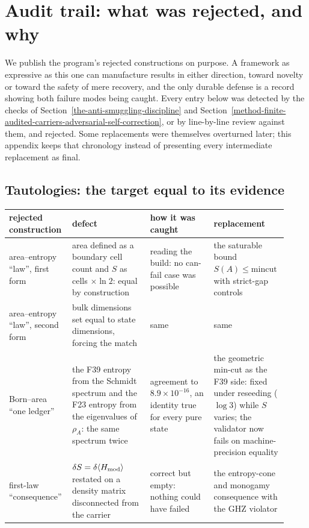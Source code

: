 \section{Audit trail: what was rejected, and why}\label{adversarial-audit-trail-what-was-rejected-and-why}

We publish the program's rejected constructions on purpose. A framework as expressive as this one can manufacture
results in either direction, toward novelty or toward the safety of mere recovery, and the only durable defense is a
record showing both failure modes being caught. Every entry below was detected by the checks of
Section~\ref{the-anti-smuggling-discipline} and Section~\ref{method-finite-audited-carriers-adversarial-self-correction},
or by line-by-line review against them, and rejected. Some replacements were themselves overturned later; this appendix
keeps that chronology instead of presenting every intermediate replacement as final.

\subsection{Tautologies: the target equal to its evidence}\label{tautologies-the-target-equal-to-its-evidence}

\begin{center}
\small
\begin{longtable}[]{@{}p{0.2\linewidth}p{0.27\linewidth}p{0.22\linewidth}p{0.23\linewidth}@{}}
\toprule
rejected construction & defect & how it was caught & replacement\\
\midrule
\endhead
area--entropy ``law'', first form & area defined as a boundary cell count and \(S\) as cells \(\times\ln2\): equal by
construction & reading the build: no can-fail case was possible & the saturable bound \(S(A)\le\mathrm{mincut}\) with
strict-gap controls\\
area--entropy ``law'', second form & bulk dimensions set equal to state dimensions, forcing the match & same & same\\
Born--area ``one ledger'' & the F39 entropy from the Schmidt spectrum and the F23 entropy from the eigenvalues of
\(\rho_A\): the same spectrum twice & agreement to \(8.9\times10^{-16}\), an identity true for every pure state & the
geometric min-cut as the F39 side: fixed under reseeding (\(\log3\)) while \(S\) varies; the validator now fails on
machine-precision equality\\
first-law ``consequence'' & \(\delta S=\delta\langle H_{\rm mod}\rangle\) restated on a density matrix disconnected
from the carrier & correct but empty: nothing could have failed & the entropy-cone and monogamy consequence with the
GHZ violator\\
\bottomrule
\end{longtable}
\end{center}

